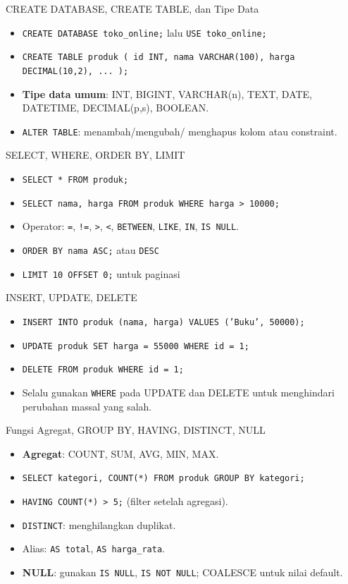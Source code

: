 \documentclass[handout]{beamer}
\begin{document}
\begin{frame}{CREATE DATABASE, CREATE TABLE, dan Tipe Data}
	\begin{itemize}
		\item \texttt{CREATE DATABASE toko\_online;} lalu \texttt{USE toko\_online;}
		\item \texttt{CREATE TABLE produk ( id INT, nama VARCHAR(100), harga DECIMAL(10,2), ... );}
		\item \textbf{Tipe data umum}: INT, BIGINT, VARCHAR(n), TEXT, DATE, DATETIME, DECIMAL(p,s), BOOLEAN.
		\item \texttt{ALTER TABLE}: menambah/mengubah/ menghapus kolom atau constraint.
	\end{itemize}
\end{frame}

\begin{frame}{SELECT, WHERE, ORDER BY, LIMIT}
	\begin{itemize}
		\item \texttt{SELECT * FROM produk;}
		\item \texttt{SELECT nama, harga FROM produk WHERE harga > 10000;}
		\item Operator: \texttt{=}, \texttt{!=}, \texttt{>}, \texttt{<}, \texttt{BETWEEN}, \texttt{LIKE}, \texttt{IN}, \texttt{IS NULL}.
		\item \texttt{ORDER BY nama ASC;} atau \texttt{DESC}
		\item \texttt{LIMIT 10 OFFSET 0;} untuk paginasi
	\end{itemize}
\end{frame}

\begin{frame}{INSERT, UPDATE, DELETE}
	\begin{itemize}
		\item \texttt{INSERT INTO produk (nama, harga) VALUES ('Buku', 50000);}
		\item \texttt{UPDATE produk SET harga = 55000 WHERE id = 1;}
		\item \texttt{DELETE FROM produk WHERE id = 1;}
		\item Selalu gunakan \texttt{WHERE} pada UPDATE dan DELETE untuk menghindari perubahan massal yang salah.
	\end{itemize}
\end{frame}

\begin{frame}{Fungsi Agregat, GROUP BY, HAVING, DISTINCT, NULL}
	\begin{itemize}
		\item \textbf{Agregat}: COUNT, SUM, AVG, MIN, MAX.
		\item \texttt{SELECT kategori, COUNT(*) FROM produk GROUP BY kategori;}
		\item \texttt{HAVING COUNT(*) > 5;} (filter setelah agregasi).
		\item \texttt{DISTINCT}: menghilangkan duplikat.
		\item Alias: \texttt{AS total}, \texttt{AS harga\_rata}.
		\item \textbf{NULL}: gunakan \texttt{IS NULL}, \texttt{IS NOT NULL}; COALESCE untuk nilai default.
	\end{itemize}
\end{frame}
\end{document}
